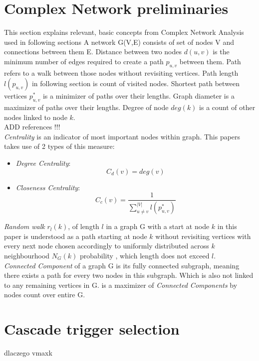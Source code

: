 \documentclass[twoside]{iisthesis}
\begin{document}
\section{Complex Network preliminaries}
This section explains relevant, basic concepts from Complex Network Analysis used in following sections
A network G(V,E) consists of set of nodes V and connections between them E. Distance between two nodes \(d(u,v)\) is the minimum number of edges required to create a path \(p_{u,v}\) between them. Path refers to a walk between those nodes without revisiting vertices. Path length \(l(p_{u,v})\) in following section is count of visited nodes. Shortest path between vertices \(p^*_{u,v}\) is a minimizer of paths over their lengths. Graph diameter is a maximizer of paths over their lengths. Degree of node \(deg(k)\) is a count of other nodes linked to node \(k\). 
\\ ADD references !!!\\
\textit{Centrality} is an indicator of most important nodes within graph. This papers takes use of 2 types of this measure:
\begin{itemize}
	\item{\textit{Degree Centrality}}:
	\begin{equation}\label{eq:d_centr}
		C_d(v) = deg(v)
	\end{equation}
	
	\item{\textit{Closeness Centrality}}:
	\begin{equation}\label{eq:c_centr}
		C_c(v) = \dfrac{1}{\sum_{u\neq v}^{|V|}l(p^*_{u,v})}
	\end{equation}
\end{itemize}

\textit{Random walk} \(r_l(k)\), of length \(l\) in a graph G with a start at node \(k\)  in this paper is understood as a path starting at node \(k\) without revisiting vertices with every next node chosen accordingly to uniformly distributed across \(k\) neighbourhood \(N_G(k)\) probability , which length does not exceed \(l\).
\\
\textit{Connected Component} of a graph G is its fully connected subgraph, meaning there exists a path for every two nodes in this subgraph. Which is also not linked to any remaining vertices in G.  is a maximizer of \textit{Connected Components} by nodes count over entire G.
\\

\section{Cascade trigger selection}
dlaczego vmaxk
\end{document}

